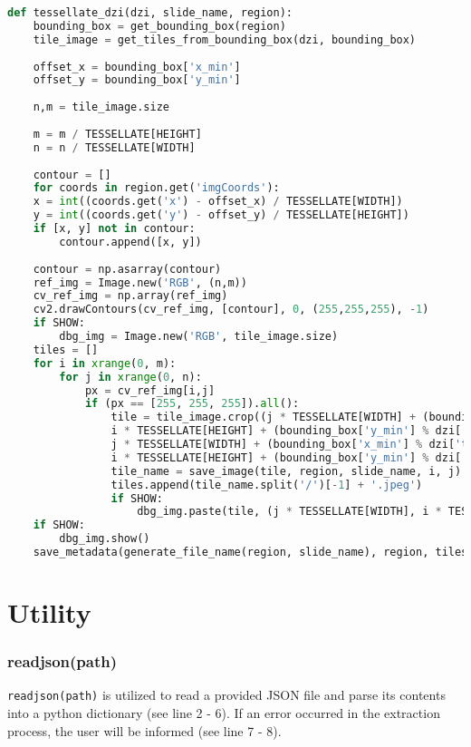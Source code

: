 \begin{lstlisting}[frame=single,language=python]
def tessellate_dzi(dzi, slide_name, region):
	bounding_box = get_bounding_box(region)
	tile_image = get_tiles_from_bounding_box(dzi, bounding_box)
	
	offset_x = bounding_box['x_min']
	offset_y = bounding_box['y_min']
	
	n,m = tile_image.size
	
	m = m / TESSELLATE[HEIGHT]
	n = n / TESSELLATE[WIDTH]
	
	contour = []
	for coords in region.get('imgCoords'):
	x = int((coords.get('x') - offset_x) / TESSELLATE[WIDTH])
	y = int((coords.get('y') - offset_y) / TESSELLATE[HEIGHT])
	if [x, y] not in contour:
		contour.append([x, y])
	
	contour = np.asarray(contour)
	ref_img = Image.new('RGB', (n,m))
	cv_ref_img = np.array(ref_img)
	cv2.drawContours(cv_ref_img, [contour], 0, (255,255,255), -1)
	if SHOW:
		dbg_img = Image.new('RGB', tile_image.size)
	tiles = []
	for i in xrange(0, m):
		for j in xrange(0, n):
			px = cv_ref_img[i,j]
			if (px == [255, 255, 255]).all():
				tile = tile_image.crop((j * TESSELLATE[WIDTH] + (bounding_box['x_min'] % dzi['tile_size']),
				i * TESSELLATE[HEIGHT] + (bounding_box['y_min'] % dzi['tile_size']),
				j * TESSELLATE[WIDTH] + (bounding_box['x_min'] % dzi['tile_size']) + TESSELLATE[WIDTH],
				i * TESSELLATE[HEIGHT] + (bounding_box['y_min'] % dzi['tile_size']) + TESSELLATE[HEIGHT]))
				tile_name = save_image(tile, region, slide_name, i, j)
				tiles.append(tile_name.split('/')[-1] + '.jpeg')
				if SHOW:
					dbg_img.paste(tile, (j * TESSELLATE[WIDTH], i * TESSELLATE[HEIGHT]))
	if SHOW:
		dbg_img.show()
	save_metadata(generate_file_name(region, slide_name), region, tiles)
\end{lstlisting}


\section{Utility}

\subsubsection{read{\textunderscore}json(path)}
\texttt{read{\textunderscore}json(path)} is utilized to read a provided JSON file and parse its contents into a python dictionary (see line 2 - 6). If an error occurred in the extraction process, the user will be informed (see line 7 - 8).

